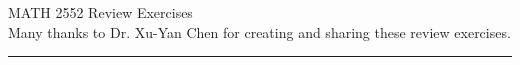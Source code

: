 \documentclass[12pt]{article}
\begin{document}








\def\PROBONE{Problems [1]-[13]}
\def\PROBTWO{Problems [14]-[35]}
\def\PROBFINAL{All problems below}


\vspace*{-2em}


\begin{center}

    \large{MATH 2552 Review Exercises} \\[12pt]

    \normalsize{Many thanks to Dr. Xu-Yan Chen for creating and sharing these review exercises. }
\end{center}

\medskip

\hrule

\medskip





\end{document}
